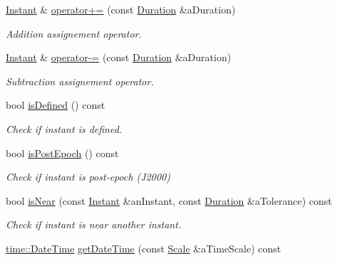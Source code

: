 \begin{DoxyCompactItemize}
\hyperlink{classostk_1_1physics_1_1time_1_1_instant}{Instant} \& \hyperlink{classostk_1_1physics_1_1time_1_1_instant_a48ba0a7bd60a02b7c7f989adc9a451cb}{operator+=} (const \hyperlink{classostk_1_1physics_1_1time_1_1_duration}{Duration} \&a\+Duration)
\begin{DoxyCompactList}\small\item\em Addition assignement operator. \end{DoxyCompactList}\item 
\hyperlink{classostk_1_1physics_1_1time_1_1_instant}{Instant} \& \hyperlink{classostk_1_1physics_1_1time_1_1_instant_abac01f937383ef281b4047ad692453ba}{operator-\/=} (const \hyperlink{classostk_1_1physics_1_1time_1_1_duration}{Duration} \&a\+Duration)
\begin{DoxyCompactList}\small\item\em Subtraction assignement operator. \end{DoxyCompactList}\item 
bool \hyperlink{classostk_1_1physics_1_1time_1_1_instant_a3036cb77f2686a81c51f0c658881b3ff}{is\+Defined} () const
\begin{DoxyCompactList}\small\item\em Check if instant is defined. \end{DoxyCompactList}\item 
bool \hyperlink{classostk_1_1physics_1_1time_1_1_instant_a2e7fcfd9e7aae17b737ee138098b9771}{is\+Post\+Epoch} () const
\begin{DoxyCompactList}\small\item\em Check if instant is post-\/epoch (J2000) \end{DoxyCompactList}\item 
bool \hyperlink{classostk_1_1physics_1_1time_1_1_instant_a6bbb53cd76ec7d4e89ebbb45cf7ae03b}{is\+Near} (const \hyperlink{classostk_1_1physics_1_1time_1_1_instant}{Instant} \&an\+Instant, const \hyperlink{classostk_1_1physics_1_1time_1_1_duration}{Duration} \&a\+Tolerance) const
\begin{DoxyCompactList}\small\item\em Check if instant is near another instant. \end{DoxyCompactList}\item 
\hyperlink{classostk_1_1physics_1_1time_1_1_date_time}{time\+::\+Date\+Time} \hyperlink{classostk_1_1physics_1_1time_1_1_instant_a3fccf9781f8466ce2163aa2396f70560}{get\+Date\+Time} (const \hyperlink{namespaceostk_1_1physics_1_1time_adf23d37bd8641fb76a0e98ab46a70df7}{Scale} \&a\+Time\+Scale) const

\end{DoxyCompactItemize}
